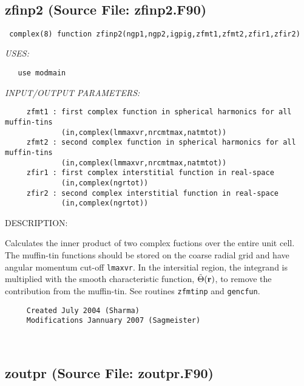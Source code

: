\documentclass[11pt]{article}
\begin{document}
\mbox{}\hrulefill\ 
 
\subsection{zfinp2 (Source File: zfinp2.F90)}


\begin{verbatim} complex(8) function zfinp2(ngp1,ngp2,igpig,zfmt1,zfmt2,zfir1,zfir2)\end{verbatim}{\em USES:}
\begin{verbatim}   use modmain\end{verbatim}{\em INPUT/OUTPUT PARAMETERS:}
\begin{verbatim}     zfmt1 : first complex function in spherical harmonics for all muffin-tins
             (in,complex(lmmaxvr,nrcmtmax,natmtot))
     zfmt2 : second complex function in spherical harmonics for all muffin-tins
             (in,complex(lmmaxvr,nrcmtmax,natmtot))
     zfir1 : first complex interstitial function in real-space
             (in,complex(ngrtot))
     zfir2 : second complex interstitial function in real-space
             (in,complex(ngrtot))\end{verbatim}
{\sf DESCRIPTION:\\ }


     Calculates the inner product of two complex fuctions over the entire unit
     cell. The muffin-tin functions should be stored on the coarse radial grid
     and have angular momentum cut-off {\tt lmaxvr}. In the intersitial region,
     the integrand is multiplied with the smooth characteristic function,
     $\tilde{\Theta}({\bf r})$, to remove the contribution from the muffin-tin.
     See routines {\tt zfmtinp} and {\tt gencfun}.
  
\begin{verbatim}     Created July 2004 (Sharma)
     Modifications Jannuary 2007 (Sagmeister)\end{verbatim}


 
 
\mbox{}\hrulefill\ 
 
\subsection{zoutpr (Source File: zoutpr.F90)}
\end{document}
